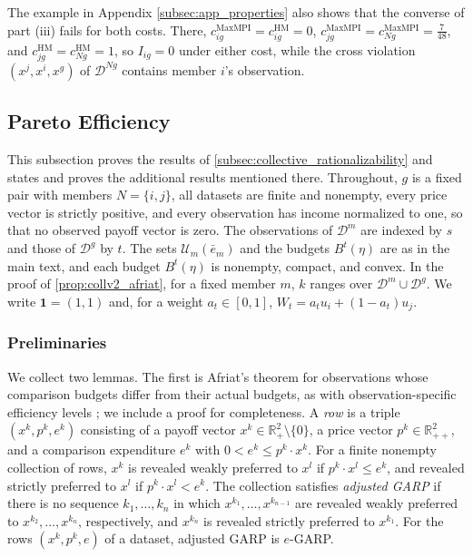 \documentclass[11 pt]{article}
\begin{document}
The example in Appendix \autoref{subsec:app_properties} also shows that the converse of part (iii) fails for both costs. There, $c^{\mathrm{MaxMPI}}_{ig} = c^{\mathrm{HM}}_{ig} = 0$, $c^{\mathrm{MaxMPI}}_{jg} = c^{\mathrm{MaxMPI}}_{Ng} = \tfrac{7}{48}$, and $c^{\mathrm{HM}}_{jg} = c^{\mathrm{HM}}_{Ng} = 1$, so $I_{ig} = 0$ under either cost, while the cross violation $(x^{j}, x^{i}, x^{g})$ of $\mathcal{D}^{Ng}$ contains member $i$'s observation.


\subsection{Pareto Efficiency}\label{appendix:collv2}

This subsection proves the results of \autoref{subsec:collective_rationalizability} and states and proves the additional results mentioned there. Throughout, $g$ is a fixed pair with members $N = \{i,j\}$, all datasets are finite and nonempty, every price vector is strictly positive, and every observation has income normalized to one, so that no observed payoff vector is zero. The observations of $\mathcal{D}^{m}$ are indexed by $s$ and those of $\mathcal{D}^{g}$ by $t$. The sets $\mathcal{U}_{m}(\bar e_{m})$ and the budgets $B^{t}(\eta)$ are as in the main text, and each budget $B^{t}(\eta)$ is nonempty, compact, and convex. In the proof of \autoref{prop:collv2_afriat}, for a fixed member $m$, $k$ ranges over $\mathcal{D}^{m} \cup \mathcal{D}^{g}$. We write $\mathbf{1} = (1,1)$ and, for a weight $a_{t} \in [0,1]$, $W_{t} = a_{t} u_{i} + (1 - a_{t}) u_{j}$.

\subsubsection{Preliminaries}\label{subsec:app_collv2_prelim}

We collect two lemmas. The first is Afriat's theorem for observations whose comparison budgets differ from their actual budgets, as with observation-specific efficiency levels \citep{varian1990goodness, halevyetal:2018:JPE}; we include a proof for completeness. A \emph{row} is a triple $(x^{k}, p^{k}, e^{k})$ consisting of a payoff vector $x^{k} \in \mathbb{R}^{2}_{+} \setminus \{0\}$, a price vector $p^{k} \in \mathbb{R}^{2}_{++}$, and a comparison expenditure $e^{k}$ with $0 < e^{k} \leq p^{k} \cdot x^{k}$. For a finite nonempty collection of rows, $x^{k}$ is revealed weakly preferred to $x^{l}$ if $p^{k} \cdot x^{l} \leq e^{k}$, and revealed strictly preferred to $x^{l}$ if $p^{k} \cdot x^{l} < e^{k}$. The collection satisfies \emph{adjusted GARP} if there is no sequence $k_{1}, \dots, k_{n}$ in which $x^{k_1}, \dots, x^{k_{n-1}}$ are revealed weakly preferred to $x^{k_2}, \dots, x^{k_n}$, respectively, and $x^{k_n}$ is revealed strictly preferred to $x^{k_1}$. For the rows $(x^{k}, p^{k}, e)$ of a dataset, adjusted GARP is $e$-GARP.
\end{document}
